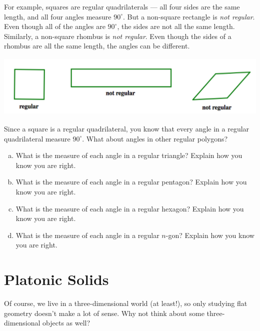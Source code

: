 For example, squares are regular quadrilaterals --- all four sides are the same length, and all four angles measure $90^\circ$.  But  a non-square rectangle is \emph{not regular}.  Even though all of the angles are $90^\circ$, the sides are not all the same length.  Similarly,  a non-square rhombus is \emph{not regular}.  Even though the sides of a rhombus are all the same length, the angles can be different.  

\begin{center}
\includegraphics[height=3cm]{regnotreg}
\end{center}

\bigskip

\begin{problem}
Since a square is a regular quadrilateral, you know that every angle in a regular quadrilateral measure $90^\circ$.  What about angles in other regular polygons?

\begin{enumerate}[(a)]
\item
What is the measure of each angle in a regular triangle?  Explain how you know you are right.\\

\item
What is the measure of each angle in a regular pentagon?  Explain how you know you are right.\\

\item
What is the measure of each angle in a regular hexagon?  Explain how you know you are right.\\

\item
What is the measure of each angle in a regular $n$-gon?  Explain how you know you are right.\\
\end{enumerate}
\end{problem}


\newpage


\section{Platonic Solids}
Of course, we live in a three-dimensional world (at least!), so only studying flat geometry doesn't make a lot of sense.  Why not think about some three-dimensional objects as well?

